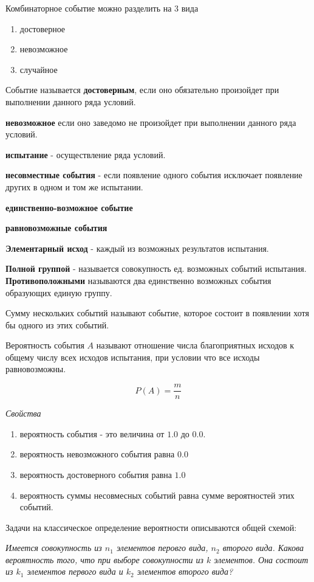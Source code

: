 \documentclass[a4paper]{article}
\begin{document}
Комбинаторное событие можно разделить на 3 вида
\begin{enumerate}
\item достоверное
\item невозможное
\item случайное
\end{enumerate}

Событие называется \textbf{достоверным}, если оно обязательно произойдет при выполнении данного ряда условий.

\textbf{невозможное} если оно заведомо не произойдет при выполнении данного ряда условий.

\textbf{испытание} - осуществление ряда условий. 

\textbf{несовместные события} - если появление одного события исключает появление других в одном и том же испытании. 

\textbf{единственно-возможное событие}

\textbf{равновозможные события}

\textbf{Элементарный исход} - каждый из возможных результатов испытания.

\textbf{Полной группой} - называется совокупность ед. возможных событий испытания. \textbf{Противоположными} называются два единственно возможных события образующих единую группу. 

Сумму нескольких событий называют событие, которое состоит в появлении хотя бы одного из этих событий.

Вероятность события $A$ называют отношение числа благоприятных исходов к общему числу всех исходов испытания, при условии что все исходы равновозможны. 

$$ P(A) = \frac{m}{n} $$

\textit{Свойства}

\begin{enumerate}
    \item вероятность события - это величина от $1.0$ до $0.0$.
    \item вероятность невозможного события равна $0.0$
    \item вероятность достоверного события равна $1.0$
    \item вероятность суммы несовмесных событий равна сумме вероятностей этих событий. 
\end{enumerate}

Задачи на классическое определение вероятности описываются общей схемой:

\emph{Имеется совокупность из $n_1$ элементов перовго вида, $n_2$ второго вида. Какова вероятность того, что при выборе совокупности из $k$ элементов. Она состоит из $k_1$ элементов первого вида и $k_2$ элементов второго вида?}
 
\end{document}
